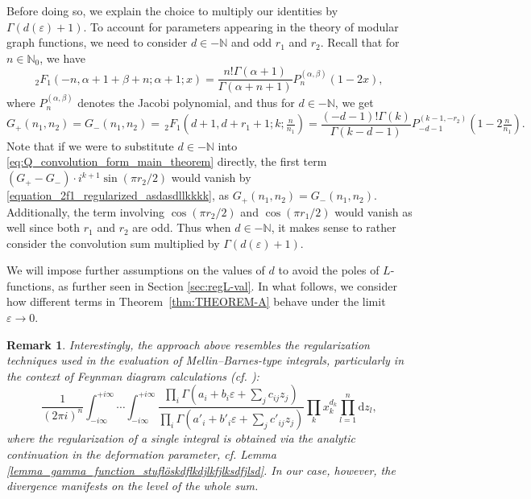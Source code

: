 \documentclass[]{article}
\newtheorem{remark}[thm]{Remark}
\begin{document}
Before doing so, we explain the choice to multiply our identities by $\Gamma(d(\varepsilon)+1)$. To account for parameters appearing in the theory of modular graph functions, we need to consider $d \in - \mathbb{N}$ and odd $r_1$ and $r_2$. Recall that for $n \in \mathbb{N}_0$,  we have \cite[15.9.1]{NIST}
\begin{equation}\label{eq:2F1_vs_Jacobi_functions}
{ }_2 F_1(-n, \alpha+1+\beta+n ; \alpha+1 ; x)=\frac{n! \Gamma(\alpha+1)}{ \Gamma(\alpha+n+1)} P_n^{(\alpha, \beta)}(1-2 x),
\end{equation}
where $P_n^{(\alpha, \beta)}$ denotes the Jacobi polynomial, 
and thus for $d \in -\mathbb{N}$, we get
\begin{equation} \label{equation_2f1_regularized_asdasdllkkkk}
G_+(n_1,n_2) = G_-(n_1,n_2) = \, _2F _1 (d+1,d+r_1+1;k;\tfrac{n}{n_1}) = \frac{(-d-1)! \Gamma(k) }{ \Gamma(k-d-1) } P^{  (k-1, -r_2) }_{-d-1} (1-2 \tfrac{n}{n_1}).
\end{equation}
Note that if we were to substitute $d \in - \mathbb{N}$  into \eqref{eq:Q_convolution_form_main_theorem} directly, the first term ${\left(  G_+  - G_-  \right) \cdot  i^{k+1} \sin( \pi r_2 / 2)}$ would vanish by \eqref{equation_2f1_regularized_asdasdllkkkk}, as $G_+(n_1, n_2)=G_-(n_1, n_2)$. Additionally, the term involving $\cos(\pi r_2 / 2)$ and $\cos(\pi r_1 / 2)$ would vanish as well since both $r_1$ and $r_2$ are odd. 
Thus when  $d \in -\mathbb{N}$, it makes sense to rather consider the convolution sum multiplied by $\Gamma(d(\varepsilon)+1)$.

We will impose further assumptions on the values of $d$ to avoid the poles of $L$-functions, as further seen in Section \ref{sec:regL-val}. In what follows, we consider how different terms in 
Theorem~\ref{thm:THEOREM-A} behave under the limit $\varepsilon \to 0$. 

\begin{remark}
Interestingly, the approach above resembles the regularization techniques used in the evaluation of Mellin–Barnes-type integrals, particularly in the context of Feynman diagram calculations (cf. \cite{smirnov2009resolution}):
\[
\frac{1}{(2\pi i)^n} \int_{-i\infty}^{+i\infty} \cdots \int_{-i\infty}^{+i\infty} 
\frac{ \prod_i \Gamma\left( a_i + b_i \varepsilon + \sum_j c_{ij} z_j \right) }
     { \prod_i \Gamma\left( a'_i + b'_i \varepsilon + \sum_j c'_{ij} z_j \right) }
\prod_k x_k^{d_k} \prod_{l=1}^n \mathrm{d}z_l,
\]
where the regularization of a single integral is obtained via the analytic continuation in the  deformation parameter, cf. Lemma \ref{lemma_gamma_function_stuflöskdflkdjlkfjlksdfjlsd}. In our case, however, the divergence manifests on the level of the whole sum.
\end{remark}
\end{document}
